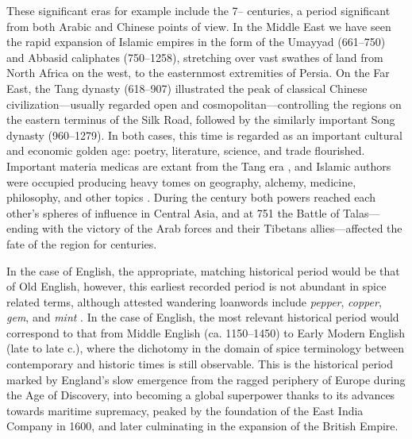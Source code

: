 These significant eras for example include the 7-- centuries, a period significant from both Arabic and Chinese points of view. In the Middle East we have seen the rapid expansion of Islamic empires in the form of the Umayyad (661--750) and Abbasid caliphates (750--1258), stretching over vast swathes of land from North Africa on the west, to the easternmost extremities of Persia. On the Far East, the Tang dynasty (618--907) illustrated the peak of classical Chinese civilization---usually regarded open and cosmopolitan---controlling the regions on the eastern terminus of the Silk Road, followed by the similarly important Song dynasty (960--1279). In both cases, this time is regarded as an important cultural and economic golden age: poetry, literature, science, and trade flourished. Important \glspl{materia medica} are extant from the Tang era \autocite{wu_illustrated_2005}, and Islamic authors were occupied producing heavy tomes on geography, alchemy, medicine, philosophy, and other topics \autocite[131]{meri_medieval_2006}. During the  century both powers reached each other's spheres of influence in Central Asia, and at 751 the Battle of Talas---ending with the victory of the Arab forces and their Tibetans allies---affected the fate of the region for centuries. 

In the case of English, the appropriate, matching historical period would be that of Old English, however, this earliest recorded period is not abundant in spice related terms, although attested wandering loanwords include \textit{pepper}, \textit{copper}, \textit{gem}, and \textit{mint} \autocite{wollman_early_1993}. In the case of English, the most relevant historical period would correspond to that from Middle English (ca. 1150--1450) to Early Modern English (late  to late  c.), where the dichotomy in the domain of spice terminology between contemporary and historic times is still observable. This is the historical period marked by England's slow emergence from the ragged periphery of Europe during the Age of Discovery, into becoming a global superpower thanks to its advances towards maritime supremacy, peaked by the foundation of the East India Company in 1600, and later culminating in the expansion of the British Empire.





